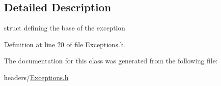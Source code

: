 \subsection{Detailed Description}
struct defining the base of the exception 

Definition at line 20 of file Exceptions.\+h.



The documentation for this class was generated from the following file\+:\begin{DoxyCompactItemize}
\item 
headers/\hyperlink{Exceptions_8h}{Exceptions.\+h}\end{DoxyCompactItemize}
